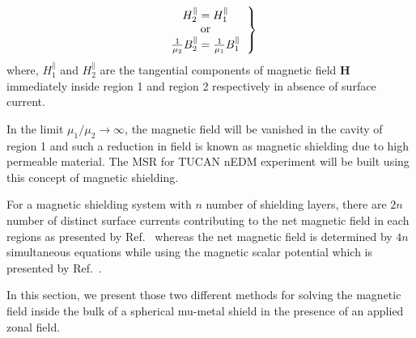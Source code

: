 \begin{equation}\label{b2}   
\left.
  \begin{tabular}{ccc}
  $H_2^\parallel=H_1^\parallel$\\
  or \\
  $\frac{1}{\mu_2}B_2^\parallel=\frac{1}{\mu_1}B_1^\parallel$
  \end{tabular}
 \right\}
\end{equation}
where, $H_1^\parallel$ and $H_2^\parallel$ are the tangential components of magnetic field $\bm{H}$ immediately inside region 1 and region 2 respectively in absence of surface current.



In the limit $\mu_1/\mu_2\rightarrow\infty$, the magnetic field will be vanished in the cavity of region 1 and such a reduction in field is known as magnetic shielding due to high permeable material. The MSR for TUCAN nEDM experiment will be built using this concept of magnetic shielding. 

For a magnetic shielding system with $n$ number of shielding layers, there are $2n$ number of distinct surface currents contributing to the net magnetic field in each regions as presented by Ref.~\cite{CB1} whereas the net magnetic field is determined by $4n$ simultaneous equations while using the magnetic scalar potential which is presented by Ref.~\cite{jackson}.

In this section, we present those two different methods for solving the magnetic field inside the bulk of a spherical mu-metal shield in the presence of an applied zonal field. 

